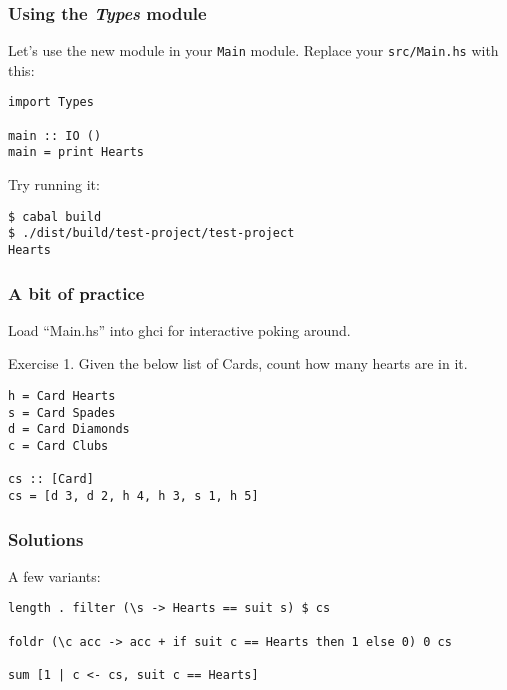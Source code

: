 \documentclass{beamer}
\begin{document}
\begin{frame}[fragile]
\frametitle{Using the {\em Types} module}

Let's use the new module in your \verb+Main+ module.  Replace your \verb+src/Main.hs+ with this:

\begin{verbatim}
import Types

main :: IO ()
main = print Hearts
\end{verbatim}

Try running it:

\begin{verbatim}
$ cabal build
$ ./dist/build/test-project/test-project
Hearts
\end{verbatim}

\end{frame}

\begin{frame}[fragile]
\frametitle{A bit of practice}

Load ``Main.hs'' into ghci for interactive poking around.

\bigskip

Exercise 1.  Given the below list of Cards, count how many hearts are
in it.

\begin{verbatim}
h = Card Hearts
s = Card Spades
d = Card Diamonds
c = Card Clubs

cs :: [Card]
cs = [d 3, d 2, h 4, h 3, s 1, h 5]
\end{verbatim}


\end{frame}

\begin{frame}[fragile]
\frametitle{Solutions}

A few variants:

{\small
\begin{verbatim}
length . filter (\s -> Hearts == suit s) $ cs

foldr (\c acc -> acc + if suit c == Hearts then 1 else 0) 0 cs

sum [1 | c <- cs, suit c == Hearts]
\end{verbatim}
}

\end{frame}
\end{document}
